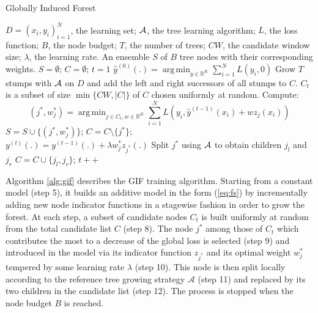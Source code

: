 \documentclass{article}
\DeclareMathOperator*{\argmin}{arg\,min}
\begin{document}
\begin{algorithm}[tb]
   \caption{Globally Induced Forest}
   \label{alg:gif}
   \small
\begin{algorithmic}[1]
     $D= (x_i,y_i)_{i=1}^N$, the learning set; ${\cal 
    A}$, the tree learning algorithm; $L$, the loss function;  $B$, the node 
    budget; $T$, the number of trees; $CW$, the candidate window size; 
    $\lambda$, the learning rate.
     An ensemble $S$ of $B$ tree nodes with their 
    corresponding weights.
    \STATE $S=\emptyset$; $C=\emptyset$; $t=1$
    \STATE $\hat{y}^{(0)}(.)= \argmin_{y \in \mathbb{R}^K} \sum_{i=1}^{N} 
    L(y_i, 0)$
    \STATE Grow $T$ stumps with ${\cal A}$ on $D$ and add the left and right 
    successors of all stumps to  $C$.    
    \REPEAT
        \STATE $C_t$ is a subset of size $\min\{CW, |C|\}$ of $C$ chosen 
        uniformly at random.
        \STATE Compute:
            \vspace{-1.5em}
            \begin{equation*}
            (j^*,w^*_j)=\argmin_{j\in C_t, w\in \mathbb{R}^K} 
            \sum_{i=1}^{N} L \left(y_i, \hat{y}^{(t-1)}(x_i) + w z_j(x_i) 
            \right)
            \end{equation*}
            \vspace{-1em}
        \STATE $S=S\cup\{(j^*,w^*_j)\}$; $C=C\setminus\{j^*\}$; \\
            $y^{(t)}(.)=y^{(t-1)}(.)+\lambda w^*_j z_{j^*}(.)$
        \STATE Split $j^*$ using ${\cal A}$ to obtain children $j_l$ and $j_r$
        \STATE $C=C\cup\{j_l,j_r\}$; $t++$
\end{algorithmic}
\end{algorithm}

Algorithm \ref{alg:gif} describes the GIF training algorithm.  Starting from a
constant model (step 5), it builds an additive model in the form (\ref{eq:fs})
by incrementally adding new node indicator functions in a stagewise fashion in
order to grow the forest.  At each step, a subset of candidate nodes $C_t$ is
built uniformly at random from the total candidate list $C$ (step 8). The node
$j^*$ among those of $C_t$ which contributes the most to a decrease of the
global loss is selected (step 9) and introduced in the model via its indicator
function $z_{j^*}$ and its optimal weight $w^*_j$ tempered by some learning rate
$\lambda$ (step 10). This node is then split locally according to the reference
tree growing strategy $\mathcal{A}$ (step 11) and replaced by its two children
in the candidate list (step 12). The process is stopped when the node budget $B$
is reached.
\end{document}
